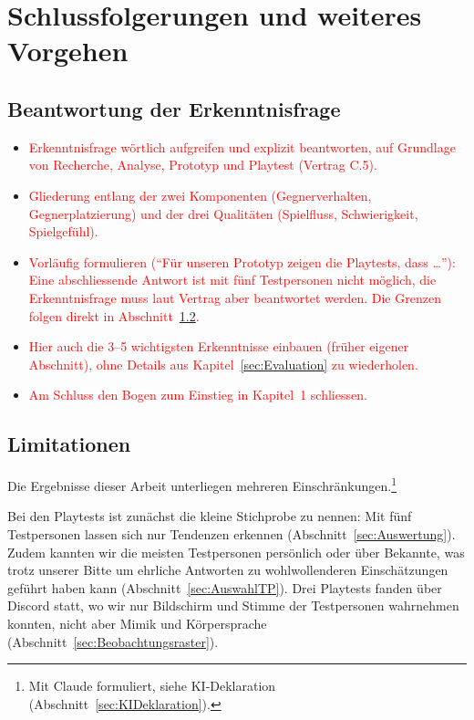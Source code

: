 \documentclass[../Main.tex]{subfiles}
\begin{document}
\section{Schlussfolgerungen und weiteres Vorgehen} \label{sec:Schlussfolgerungen}

\subsection{Beantwortung der Erkenntnisfrage} \label{sec:Beantwortung}

\begin{itemize}[leftmargin=1.5cm]
    \item \textcolor{red}{Erkenntnisfrage wörtlich aufgreifen und explizit beantworten, auf Grundlage von Recherche, Analyse, Prototyp und Playtest (Vertrag C.5).}
    \item \textcolor{red}{Gliederung entlang der zwei Komponenten (Gegnerverhalten, Gegnerplatzierung) und der drei Qualitäten (Spielfluss, Schwierigkeit, Spielgefühl).}
    \item \textcolor{red}{Vorläufig formulieren (\enquote{Für unseren Prototyp zeigen die Playtests, dass \ldots}): Eine abschliessende Antwort ist mit fünf Testpersonen nicht möglich, die Erkenntnisfrage muss laut Vertrag aber beantwortet werden. Die Grenzen folgen direkt in Abschnitt~\ref{sec:Limitationen}.}
    \item \textcolor{red}{Hier auch die 3--5 wichtigsten Erkenntnisse einbauen (früher eigener Abschnitt), ohne Details aus Kapitel~\ref{sec:Evaluation} zu wiederholen.}
    \item \textcolor{red}{Am Schluss den Bogen zum Einstieg in Kapitel~1 schliessen.}
\end{itemize}

\subsection{Limitationen} \label{sec:Limitationen}

Die Ergebnisse dieser Arbeit unterliegen mehreren Einschränkungen.\footnote{Mit Claude formuliert, siehe KI-Deklaration (Abschnitt~\ref{sec:KIDeklaration}).}

Bei den Playtests ist zunächst die kleine Stichprobe zu nennen: Mit fünf Testpersonen lassen sich nur Tendenzen erkennen (Abschnitt~\ref{sec:Auswertung}). Zudem kannten wir die meisten Testpersonen persönlich oder über Bekannte, was trotz unserer Bitte um ehrliche Antworten zu wohlwollenderen Einschätzungen geführt haben kann (Abschnitt~\ref{sec:AuswahlTP}). Drei Playtests fanden über Discord statt, wo wir nur Bildschirm und Stimme der Testpersonen wahrnehmen konnten, nicht aber Mimik und Körpersprache (Abschnitt~\ref{sec:Beobachtungsraster}).
\end{document}
